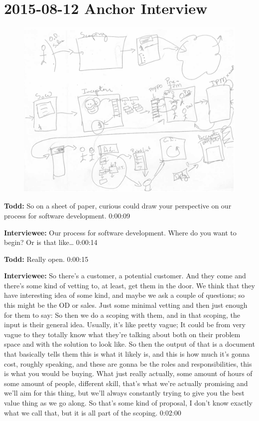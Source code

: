 \section{2015-08-12 Anchor Interview}

\begin{figure}[h]
\centering
\includegraphics[width=6.5in]{interviews/2015_08_12_anchor.png}
\caption{}
\label{2015_08_12_anchor}
\end{figure}

\textbf{Todd:} 	So on a sheet of paper, curious could draw your perspective on our process for software development. 0:00:09

\textbf{Interviewee:}  	Our process for software development.  Where do you want to begin?  Or is that like…  0:00:14

\textbf{Todd:}   Really open.  0:00:15

\textbf{Interviewee:}  	So there's a customer, a potential customer.  And they come and there's some kind of vetting to, at least, get them in the door.  We think that they have interesting idea of some kind, and maybe we ask a couple of questions; so this might be the OD or sales.  Just some minimal vetting and then just enough for them to say:   So then we do a scoping with them, and in that scoping, the input is their general idea.  Usually, it's like pretty vague; It could be from very vague to they totally know what they're talking about both on their problem space and with the solution to look like.  So then the output of that is a document that basically tells them this is what it likely is, and this is how much it's gonna cost, roughly speaking, and these are gonna be the roles and responsibilities, this is what you would be buying.  What just really actually, some amount of hours of some amount of people, different skill, that's what we're actually promising and we'll aim for this thing, but we'll always constantly trying to give you the best value thing as we go along.  So that's some kind of proposal, I don't know exactly what we call that, but it is all part of the scoping.  0:02:00

